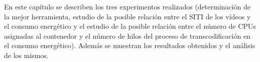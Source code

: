 En este capítulo se describen los tres experimentos realizados (determinación de la mejor herramienta, estudio de la posible relación entre el SITI de los vídeos y el consumo energético y el estudio de la posible relación entre el número de CPUs asignadas al contenedor y el número de hilos del proceso de transcodificación en el consumo energético). Además se muestran los resultados obtenidos y el análisis de los mismos.
 \label{exp1-desarrollo}
 \label{exp2-desarrollo}
 \label{exp3-desarrollo}

 
  
  
  